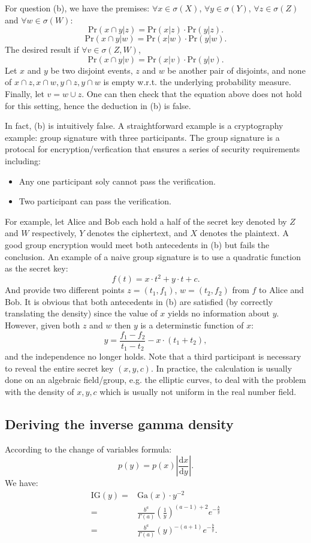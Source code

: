 \documentclass[UTF8]{ctexart}
\begin{document}
For question (b), we have the premises: $\forall x\in\sigma(X)$, $\forall y\in\sigma(Y)$, $\forall z \in\sigma(Z)$ and $\forall w\in\sigma(W)$:
$$\text{Pr}(x\cap y|z)=\text{Pr}(x|z)\cdot\text{Pr}(y|z).$$
$$\text{Pr}(x\cap y|w)=\text{Pr}(x|w)\cdot\text{Pr}(y|w).$$
The desired result if $\forall v\in\sigma(Z,W)$, 
$$\text{Pr}(x\cap y|v)=\text{Pr}(x|v)\cdot\text{Pr}(y|v).$$
Let $x$ and $y$ be two disjoint events, $z$ and $w$ be another pair of disjoints, and none of $x\cap z,x\cap w, y\cap z,y\cap w$ is empty w.r.t. the underlying probability measure. 
Finally, let $v=w\cup z$. 
One can then check that the equation above does not hold for this setting, hence the deduction in (b) is false. 

In fact, (b) is intuitively false. 
A straightforward example is a cryptography example: group signature with three participants. 
The group signature is a protocal for encryption/verfication that ensures a series of security requirements including:
\begin{itemize}
\item Any one participant soly cannot pass the verification.
\item Two participant can pass the verification. 
\end{itemize}
For example, let Alice and Bob each hold a half of the secret key denoted by $Z$ and $W$ respectively, $Y$ denotes the ciphertext, and $X$ denotes the plaintext. 
A good group encryption would meet both antecedents in (b) but fails the conclusion. 
An example of a naive group signature is to use a quadratic function as the secret key:
$$f(t)=x\cdot t^{2}+y\cdot t +c.$$
And provide two different points $z=(t_{1},f_{1})$, $w=(t_{2},f_{2})$ from $f$ to Alice and Bob. 
It is obvious that both antecedents in (b) are satisfied (by correctly translating the density) since the value of $x$ yields no information about $y$. 
However, given both $z$ and $w$ then $y$ is a determinstic function of $x$:
$$y=\frac{f_{1}-f_{2}}{t_{1}-t_{2}}-x\cdot(t_{1}+t_{2}),$$ 
and the independence no longer holds. 
Note that a third participant is necessary to reveal the entire secret key $(x,y,c)$. 
In practice, the calculation is usually done on an algebraic field/group, e.g. the elliptic curves, to deal with the problem with the density of $x,y,c$ which is usually not uniform in the real number field.

\subsection{Deriving the inverse gamma density}
According to the change of variables formula:
$$p(y)=p(x)|\frac{\text{d}x}{\text{d}y}|.$$
We have:
\begin{align}
\text{IG}(y)=&\text{Ga}(x)\cdot y^{-2} \nonumber \\
=&\frac{b^{a}}{\Gamma(a)}(\frac{1}{y})^{(a-1)+2}e^{-\frac{b}{y}} \nonumber \\
=&\frac{b^{a}}{\Gamma(a)}(y)^{-(a+1)}e^{-\frac{b}{y}}. \nonumber
\end{align}
\end{document}
